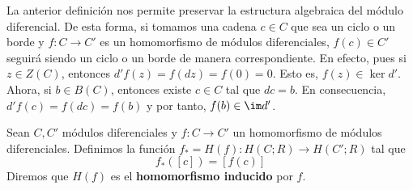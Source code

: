 La anterior definición nos permite preservar la estructura algebraica del módulo
diferencial. De esta forma, si tomamos una cadena \(c \in C\) que sea un ciclo o un
borde y \(f:C \rightarrow C'\) es un homomorfismo de módulos diferenciales,
\(f(c) \in C'\) seguirá siendo un ciclo o un borde de manera correspondiente. En efecto,
pues si \(z \in Z(C)\), entonces \(d'f(z) = f(dz) = f(0) = 0\). Esto es, \(f(z) \in \ker
d'\). Ahora, si \(b \in B(C)\), entonces existe \(c \in C\) tal que \(dc = b\). En consecuencia,
\(d'f(c) = f(dc) = f(b)\) y por tanto, \(f(b) \in \im d'\).
%
\begin{definicion}
	Sean \(C, C'\) módulos diferenciales y \(f:C \rightarrow C'\) un homomorfismo de módulos
	diferenciales. Definimos la función \(f_{*} = H(f): H(C;R) \rightarrow H(C';R)\)
	tal que
	\[
	f_{*}([c]) = [f(c)]
	\]
	Diremos que \(H(f)\) es el \textbf{homomorfismo inducido} por \(f\).
\end{definicion}

